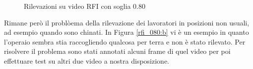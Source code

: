\begin{figure}[]
    \begin{minipage}{.5\linewidth}
        \centering
    \end{minipage}%
    \begin{minipage}{.5\linewidth}
        \centering
    \end{minipage}
    \centering
    \caption{Rilevazioni su video RFI con soglia 0.80}
    \label{fig:rfi_080}
\end{figure}

Rimane però il problòema  della rilevazione dei lavoratori in posizioni non usuali, ad esempio quando sono chinati. In Figura \ref{rfi_080:b} vi è un esempio in quanto l'operaio sembra stia raccogliendo qualcosa per terra e non è stato rilevato. Per risolvere il problema sono stati annotati alcuni frame di quel video per poi effettuare test su altri due video a nostra disposizione. 
